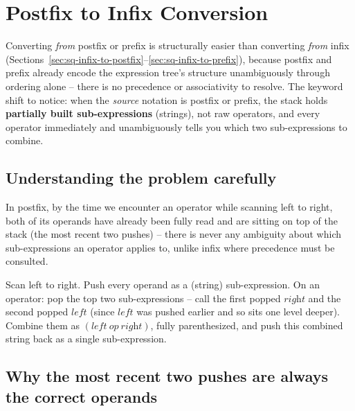 \section{Postfix to Infix Conversion}
\label{sec:sq-postfix-to-infix}


\begin{patternbox}
Converting \emph{from} postfix or prefix is structurally easier than
converting \emph{from} infix (Sections~\ref{sec:sq-infix-to-postfix}--\ref{sec:sq-infix-to-prefix}),
because postfix and prefix already encode the expression tree's structure
unambiguously through ordering alone -- there is no precedence or
associativity to resolve. The keyword shift to notice: when the
\emph{source} notation is postfix or prefix, the stack holds
\textbf{partially built sub-expressions} (strings), not raw operators, and
every operator immediately and unambiguously tells you which two
sub-expressions to combine.
\end{patternbox}

\subsection*{Understanding the problem carefully}

In postfix, by the time we encounter an operator while scanning left to
right, both of its operands have already been fully read and are sitting
on top of the stack (the most recent two pushes) -- there is never any
ambiguity about which sub-expressions an operator applies to, unlike
infix where precedence must be consulted.

\begin{ideabox}
Scan left to right. Push every operand as a (string) sub-expression. On
an operator: pop the top two sub-expressions -- call the first popped
$\textit{right}$ and the second popped $\textit{left}$ (since
$\textit{left}$ was pushed earlier and so sits one level deeper). Combine
them as $(\textit{left}\ \textit{op}\ \textit{right})$, fully
parenthesized, and push this combined string back as a single
sub-expression.
\end{ideabox}

\subsection*{Why the most recent two pushes are always the correct operands}

